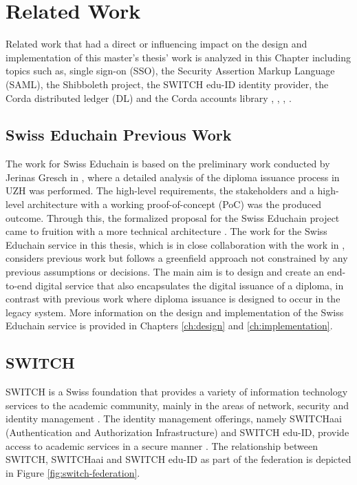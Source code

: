\chapter{Related Work}

 Related work that had a direct or influencing impact on the design and implementation of this master's thesis' work is analyzed in this Chapter including topics such as, single sign-on (SSO), the Security Assertion Markup Language (SAML), the Shibboleth project, the SWITCH edu-ID identity provider, the Corda distributed ledger (DL)  and the Corda accounts library \cite{shib-website},  \cite{eduid-website}, \cite{corda-website}, \cite{corda-accounts-library}. 

\section{Swiss Educhain Previous Work}

The work for Swiss Educhain is based on the preliminary work conducted by Jerinas Gresch in \cite{Gres18}, where a detailed analysis of the diploma issuance process in UZH was performed. The high-level requirements, the stakeholders and a high-level architecture with a working proof-of-concept (PoC) was the produced outcome. Through this, the formalized proposal for the Swiss Educhain project came to fruition \cite{educhain-proposal} with a more technical architecture \cite{educhain-architecture}. The work for the Swiss Educhain service in this thesis, which is in close collaboration with the work in \cite{mueller20}, considers previous work but follows a greenfield approach not constrained by any previous assumptions or decisions. The main aim is to design and create an end-to-end digital service that also encapsulates the digital issuance of a diploma, in contrast with previous work where diploma issuance is designed to occur in the legacy system. More information on the design and implementation of the Swiss Educhain service is provided in Chapters \ref{ch:design} and \ref{ch:implementation}.  


\section{SWITCH} \label{sec:switch-related-work}

SWITCH is a Swiss foundation that provides a variety of information technology services to the academic community, mainly in the areas of network, security and identity management \cite{switch-foundation-about}. The identity management offerings, namely SWITCHaai (Authentication and Authorization Infrastructure) and SWITCH edu-ID, provide access to academic services in a secure manner \cite{switch-services-aai-eduid}. The relationship between SWITCH, SWITCHaai and SWITCH edu-ID as part of the federation \cite{switch-federation} is depicted in Figure \ref{fig:switch-federation}.

